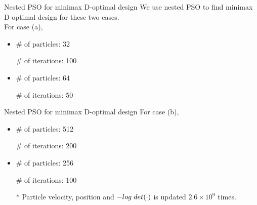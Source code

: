 \documentclass{beamer}
\begin{document}
\begin{frame}{Nested PSO for minimax D-optimal design}
  We use nested PSO to find minimax D-optimal design for these two cases.\\
  \vspace{3mm}
  For case (a),\\
  \vspace{3mm}
  \begin{itemize}
    \item {} \# of particles: 32
    \item[] \makebox[2cm][l]{} \# of iterations: 100
    \vspace{3mm}
    \item {} \# of particles: 64
    \item[] \makebox[2cm][l]{} \# of iterations: 50
  \end{itemize}
\end{frame}

\begin{frame}{Nested PSO for minimax D-optimal design}
  For case (b),\\
  \vspace{3mm}
  \begin{itemize}
    \item {} \# of particles: 512
    \item[] \makebox[2cm][l]{} \# of iterations: 200
    \vspace{3mm}
    \item {} \# of particles: 256
    \item[] \makebox[2cm][l]{} \# of iterations: 100
  \end{itemize}
  \vspace{3mm}
  \begin{itemize}
    \item[*] Particle velocity, position and $-log\hspace{1mm} det(\cdot)$ is updated $2.6 \times 10^9$ times.
  \end{itemize}
\end{frame}
\end{document}
